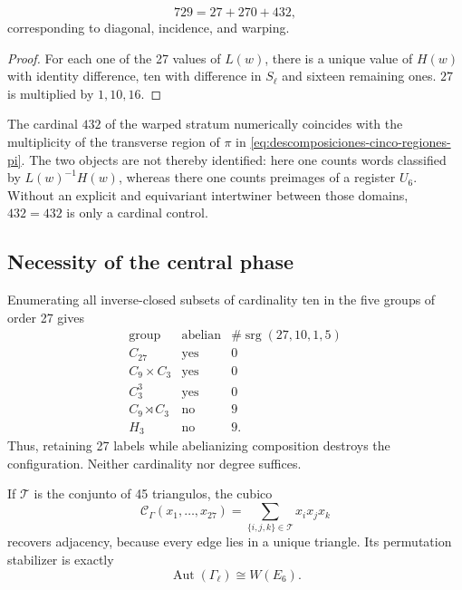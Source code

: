 \begin{theorem}
\label{p12-83-c20-s6:thm:particion-hensel-schlafli-nueva}
\begin{equation}
 729=27+270+432,
 \label{p12-83-c20-s6:eq:particion-729-e6-nueva}
\end{equation}
corresponding to diagonal, incidence, and warping.
\end{theorem}

\begin{proof}
For each one of the 27 values of \(L(w)\), there is a unique value of
\(H(w)\) with identity difference, ten with difference in \(S_\ell\) and
sixteen remaining ones. \(27\) is multiplied by \(1,10,16\).
\end{proof}

The cardinal \(432\) of the warped stratum numerically coincides with the
multiplicity of the transverse region of \(\pi\) in
\cref{eq:descomposiciones-cinco-regiones-pi}. The two objects are not thereby identified: here
one counts words classified by \(L(w)^{-1}H(w)\), whereas there one
counts preimages of a register \(U_6\). Without an explicit and
equivariant intertwiner between those domains, \(432=432\) is only a cardinal control.

\subsection{Necessity of the central phase}

Enumerating all inverse-closed subsets of cardinality ten in the five groups of order 27 gives
\[
\begin{array}{c|c|c}
\text{group}&\text{abelian}&
\#\operatorname{srg}(27,10,1,5)\\ \hline
C_{27}&\text{yes}&0\\
C_9\times C_3&\text{yes}&0\\
C_3^3&\text{yes}&0\\
C_9\rtimes C_3&\text{no}&9\\
H_3&\text{no}&9.
\end{array}
\]
Thus, retaining 27 labels while abelianizing composition destroys the
configuration. Neither cardinality nor degree suffices.

If \(\mathcal T\) is the conjunto of 45 triangulos, the cubico
\[
 \mathcal C_\Gamma(x_1,\ldots,x_{27})
 =\sum_{\{i,j,k\}\in\mathcal T}x_ix_jx_k
\]
recovers adjacency, because every edge lies in a unique triangle. Its
permutation stabilizer is exactly
\[
 \operatorname{Aut}(\Gamma_\ell)\cong W(E_6).
\]

